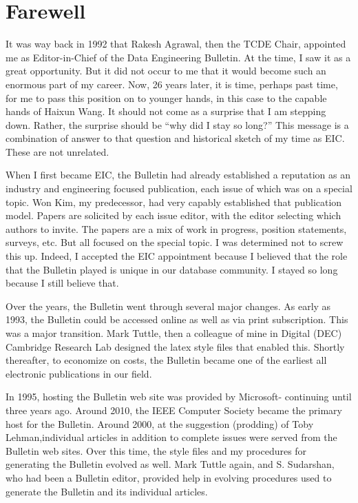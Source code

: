 \documentclass[11pt]{article}
\begin{document}
\section*{Farewell}

It was way back in 1992 that Rakesh Agrawal, then the TCDE Chair, appointed me as Editor-in-Chief of the Data Engineering Bulletin. At the time, I saw it as a great opportunity. But it did not occur to me that it would become such an enormous part of my career. Now, 26 years later, it is time, perhaps past time, for me to pass this position on to younger hands, in this case to the capable hands of Haixun Wang. It should not come as a surprise that I am stepping down. Rather, the surprise should be ``why did I stay so long?'' This message is a combination of answer to that question and historical sketch of my time as EIC. These are not unrelated.

When I first became EIC, the Bulletin had already established a reputation as an industry and engineering focused publication, each issue of which was on a special topic.  Won Kim, my predecessor, had very capably established that publication model. Papers are solicited by each issue editor, with the editor selecting which authors to invite. The papers are a mix of work in progress, position statements, surveys, etc. But all focused on the special topic. I was determined not to screw this up. Indeed, I accepted the EIC appointment because I believed that the role that the Bulletin played is unique in our database community.  I stayed so long because I still believe that.  

Over the years, the Bulletin went through several major changes. As early as 1993, the Bulletin could be accessed online as well as via print subscription. This was a major transition. Mark Tuttle, then a colleague of mine in Digital (DEC) Cambridge Research Lab designed the latex style files that enabled this. Shortly thereafter, to economize on costs, the Bulletin became one of the earliest all electronic publications in our field. 

In 1995, hosting the Bulletin web site was provided by Microsoft- continuing until three years ago. Around 2010, the IEEE Computer Society became the primary host for the Bulletin. Around 2000, at the suggestion (prodding) of Toby Lehman,individual articles in addition to complete issues were served from the Bulletin web sites. Over this time, the style files and my procedures for generating the Bulletin evolved as well. Mark Tuttle again, and S. Sudarshan, who had been a Bulletin editor, provided help in evolving procedures used to generate the Bulletin and its individual articles. 
\end{document}
